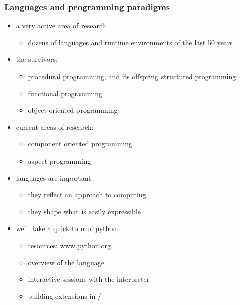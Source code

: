 %
%


\begin{frame}[fragile]
%
  \frametitle{Languages and programming paradigms}
%
  \begin{itemize}
%
  \item a very active area of research
    \begin{itemize}
    \item dozens of languages and runtime environments of the last 50 years
    \end{itemize}
%
  \item the survivors:
    \begin{itemize}
      \item procedural programming, and its offspring structured programming
      \item functional programming
      \item object oriented programming
    \end{itemize}
%
  \item current areas of research:
    \begin{itemize}
    \item component oriented programming
    \item aspect programming
    \end{itemize}
%
  \item languages are important:
    \begin{itemize}
    \item they reflect an approach to computing
    \item they shape what is easily expressible
    \end{itemize}
%
  \item we'll take a quick tour of python
    \begin{itemize}
    \item resources: \url{www.python.org}
    \item overview of the language
    \item interactive sessions with the interpreter
    \item building extensions in \cc/\cpp
    \end{itemize}
%
  \end{itemize}
%
\end{frame}

